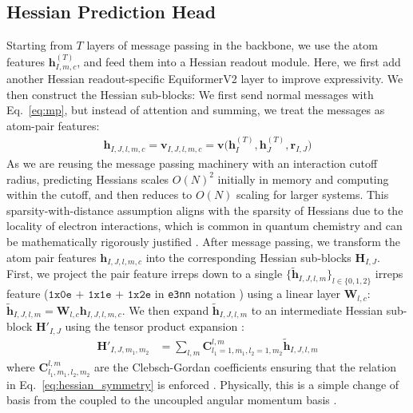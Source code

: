 \documentclass[pdflatex,sn-mathphys-num]{sn-jnl}%
\theoremstyle{thmstyleone}%
\theoremstyle{thmstyletwo}%
\theoremstyle{thmstylethree}%
\begin{document}
\subsection{Hessian Prediction Head}
Starting from $T$ layers of message passing in the backbone, we use the atom features $\mathbf{h}^{(T)}_{I,m,c}$, and feed them into a Hessian readout module. Here, we first add another Hessian readout-specific EquiformerV2 layer to improve expressivity. We then construct the Hessian sub-blocks: We first send normal messages with Eq.~\eqref{eq:mp}, but instead of attention and summing, we treat the messages as atom-pair features:
\begin{align}
    \mathbf{h}_{I,J,l,m,c} 
    = \mathbf{v}_{I,J,l,m,c} 
    = \mathbf{v} \big(\mathbf{h}^{(T)}_I, \mathbf{h}^{(T)}_J, \mathbf{r}_{I,J} \big)
\end{align}
As we are reusing the message passing machinery with an interaction cutoff radius, predicting Hessians scales $O(N)^2$ initially in memory and computing within the cutoff, and then reduces to $O(N)$ scaling for larger systems.
This sparsity-with-distance assumption aligns with the sparsity of Hessians due to the locality of electron interactions, which is common in quantum chemistry and can be mathematically rigorously justified \citep{kussmann2015reduced}.
After message passing, we transform the atom pair features $\mathbf{h}_{I,J,l,m,c}$ into the corresponding Hessian sub-blocks $\mathbf{H}_{I,J}$.
First, we project the pair feature irreps down to a single $\{\mathbf{\tilde{h}}_{I,J,l,m}\}_{l\in\{0,1,2\}}$ irreps feature ($\texttt{1x0e + 1x1e + 1x2e}$ in \texttt{e3nn} notation \citep{geiger2022e3nn}) using a linear layer $\mathbf{W}_{l,c}$:
$
\mathbf{\tilde{h}}_{I,J,l,m} = \mathbf{W}_{l,c}\mathbf{h}_{I,J,l,m,c}
$.
We then expand $\mathbf{\tilde{h}}_{I,J,l,m}$  to an intermediate Hessian sub-block $\mathbf{H}'_{I,J}$ using the tensor product expansion \citep{unke2021se}:
\begin{align}
\mathbf{H}'_{I,J,m_1,m_2} &= \sum_{l,m}\mathbf{C}^{l,m}_{l_1=1,m_1,l_2=1,m_2}\mathbf{\tilde{h}}_{I,J,l,m} \label{eq:tensor_expansion}
\end{align}
where $\mathbf{C}^{l,m}_{l_1,m_1,l_2,m_2}$ are the Clebsch-Gordan coefficients ensuring that the relation in Eq.~\eqref{eq:hessian_symmetry} is enforced \citep{unke2021se}. Physically, this is a simple change of basis from the coupled to the uncoupled angular momentum basis \citep{edmonds1996angular}.
\end{document}
